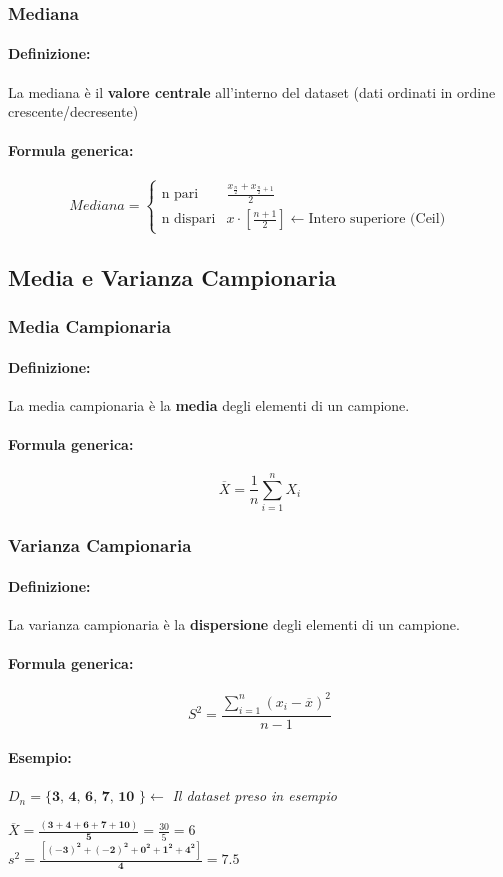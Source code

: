 \documentclass[]{article}
\newcommand{\definizione}{\paragraph{Definizione:}}
\newcommand{\formula}{\paragraph{Formula generica:}}
\begin{document}
    \subsubsection{Mediana}
    \definizione La mediana è il \textbf{valore centrale} all'interno del dataset (dati ordinati in ordine crescente/decresente)
    \formula
    \begin{equation*}
        Mediana =
        \begin{cases}
            \text{n pari} &  \frac{x_\frac{n}{2} + x_{\frac{n}{2}+ 1}}{2} \\
            \text{n dispari} & x \cdot [\frac{n+1}{2}] \leftarrow \text{Intero superiore (Ceil)}
        \end{cases}
    \end{equation*}
    \subsection{Media e Varianza Campionaria}
    \subsubsection{Media Campionaria}
    \definizione La media campionaria è la \textbf{media} degli elementi di un campione.
    \formula  \[ \overline{X} = \frac{1}{n} \sum_{i=1}^{n} X_i \]

    \subsubsection{Varianza Campionaria}
    \definizione La varianza campionaria è la \textbf{dispersione} degli elementi di un campione.
    \formula \[ S^2 = \frac{\sum_{i = 1}^{n} (x_i - \overline{x})^2}{n-1} \]

    \paragraph{Esempio:} $D_n = \textbf{\{ 3, 4, 6, 7, 10 \}} \leftarrow$ \textit{Il dataset preso in esempio} \\
    \linebreak[2]
 
     $ \overline{X} = \boldsymbol{\frac{( 3 + 4 + 6 + 7 + 10)}{5}} = \frac{30}{5} = 6 $ \\

     $ s^2 = \boldsymbol{\frac{[ (-3)^2 + (-2)^2 + 0^2 + 1^2 + 4^2 ]}{4}} = 7.5 $ 
\end{document}
